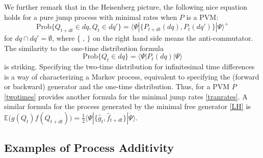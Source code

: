 \documentclass[12pt]{article}
\newcommand{\EEE}{\mathbb{E}} %
\newcommand{\1}{\mathbf{1}} %
\renewcommand{\sp}[2]{\langle #1 | #2 \rangle} %
\newcommand{\prob}{\mathrm{Prob}}
\newcommand{\pov}{{P}}%
\begin{document}
   We further remark that in the Heisenberg picture, the following nice
   equation holds for a pure jump process with minimal rates when
   $\pov$ is a PVM:
   \begin{equation}\label{twotimes}
     \prob\{Q_{t+dt} \in dq, Q_{t} \in dq'\} = \sp{\Psi} {\{\pov_{t+dt}
     (dq), \pov_{t}(dq') \} | \Psi}^+
   \end{equation}
   for $dq \cap dq' = \emptyset$, where $\{ \;,\, \}$ on the right hand
   side means the anti-commutator.  The similarity to the one-time
   distribution formula
   \[
     \prob\{Q_t \in dq\} = \sp{\Psi}{\pov_t(dq) |\Psi}
   \]
   is striking.  Specifying the two-time distribution for infinitesimal
   time differences is a way of characterizing a Markov process,
   equivalent to specifying the (forward or backward) generator and the
   one-time distribution.  Thus, for a PVM $\pov$ \eqref{twotimes}
   provides another formula for the minimal jump rates
   \eqref{tranrates}. A similar formula for the process generated by
   the minimal free generator \eqref{LH} is $\EEE \big(g(Q_t)
   f(Q_{t+dt}) \big) = \frac12 \sp{\Psi} {\{\hat{g}_t, \hat{f}_{t+dt}
   \} | \Psi}$.



\subsection{Examples of Process Additivity}
\label{sec:known}
\end{document}
